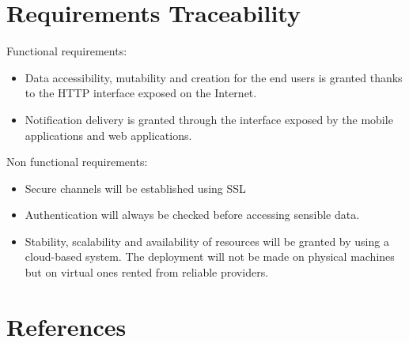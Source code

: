 \documentclass{article}
\begin{document}
	\section{Requirements Traceability}
	Functional requirements:
	\begin{itemize}
		\item Data accessibility, mutability and creation for the end users is granted thanks to the HTTP interface exposed on the Internet.
		\item Notification delivery is granted through the interface exposed by the mobile applications and web applications.
	\end{itemize}
	Non functional requirements:
	\begin{itemize}
		\item Secure channels will be established using SSL 
		\item Authentication will always be checked before accessing sensible data.
		\item Stability, scalability and availability of resources will be granted by using a cloud-based system. The deployment will not be made on physical machines but on virtual ones rented from reliable providers.
	\end{itemize}
	\section{References}
	\clearpage
\end{document}
